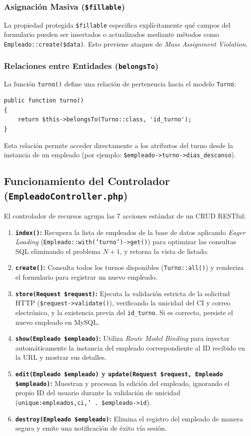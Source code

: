 \documentclass[12pt, letterpaper]{article}
\begin{document}
\subsubsection{Asignación Masiva (\texttt{\$fillable})}
La propiedad protegida \texttt{\$fillable} especifica explícitamente qué campos del formulario pueden ser insertados o actualizados mediante métodos como \texttt{Empleado::create(\$data)}. Esto previene ataques de \textit{Mass Assignment Violation}.

\subsubsection{Relaciones entre Entidades (\texttt{belongsTo})}
La función \texttt{turno()} define una relación de pertenencia hacia el modelo \texttt{Turno}:
\begin{lstlisting}[language=purePHP]
public function turno()
{
    return $this->belongsTo(Turno::class, 'id_turno');
}
\end{lstlisting}
Esta relación permite acceder directamente a los atributos del turno desde la instancia de un empleado (por ejemplo: \texttt{\$empleado->turno->dias\_descanso}).

\subsection{Funcionamiento del Controlador (\texttt{EmpleadoController.php})}
El controlador de recursos agrupa las 7 acciones estándar de un CRUD RESTful:

\begin{enumerate}
    \item \textbf{\texttt{index()}:} Recupera la lista de empleados de la base de datos aplicando \textit{Eager Loading} (\texttt{Empleado::with('turno')->get()}) para optimizar las consultas SQL eliminando el problema $N+1$, y retorna la vista de listado.
    \item \textbf{\texttt{create()}:} Consulta todos los turnos disponibles (\texttt{Turno::all()}) y renderiza el formulario para registrar un nuevo empleado.
    \item \textbf{\texttt{store(Request \$request)}:} Ejecuta la validación estricta de la solicitud HTTP (\texttt{\$request->validate()}), verificando la unicidad del CI y correo electrónico, y la existencia previa del \texttt{id\_turno}. Si es correcto, persiste el nuevo empleado en MySQL.
    \item \textbf{\texttt{show(Empleado \$empleado)}:} Utiliza \textit{Route Model Binding} para inyectar automáticamente la instancia del empleado correspondiente al ID recibido en la URL y mostrar sus detalles.
    \item \textbf{\texttt{edit(Empleado \$empleado)} y \texttt{update(Request \$request, Empleado \$empleado)}:} Muestran y procesan la edición del empleado, ignorando el propio ID del usuario durante la validación de unicidad (\texttt{unique:empleados,ci,' . \$empleado->id}).
    \item \textbf{\texttt{destroy(Empleado \$empleado)}:} Elimina el registro del empleado de manera segura y emite una notificación de éxito vía sesión.
\end{enumerate}
\end{document}
